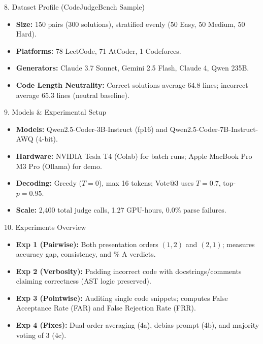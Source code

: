 \documentclass[aspectratio=169]{beamer}
\begin{document}
\begin{frame}{8. Dataset Profile (CodeJudgeBench Sample)}
  \begin{itemize}
    \item \textbf{Size:} 150 pairs (300 solutions), stratified evenly (50 Easy, 50 Medium, 50 Hard).
    \item \textbf{Platforms:} 78 LeetCode, 71 AtCoder, 1 Codeforces.
    \item \textbf{Generators:} Claude 3.7 Sonnet, Gemini 2.5 Flash, Claude 4, Qwen 235B.
    \item \textbf{Code Length Neutrality:} Correct solutions average 64.8 lines; incorrect average 65.3 lines (neutral baseline).
  \end{itemize}
\end{frame}

\begin{frame}{9. Models \& Experimental Setup}
  \begin{itemize}
    \item \textbf{Models:} Qwen2.5-Coder-3B-Instruct (fp16) and Qwen2.5-Coder-7B-Instruct-AWQ (4-bit).
    \item \textbf{Hardware:} NVIDIA Tesla T4 (Colab) for batch runs; Apple MacBook Pro M3 Pro (Ollama) for demo.
    \item \textbf{Decoding:} Greedy ($T=0$), max 16 tokens; Vote@3 uses $T=0.7$, top-$p=0.95$.
    \item \textbf{Scale:} 2,400 total judge calls, 1.27 GPU-hours, 0.0\% parse failures.
  \end{itemize}
\end{frame}

\begin{frame}{10. Experiments Overview}
  \begin{itemize}
    \item \textbf{Exp 1 (Pairwise):} Both presentation orders $(1,2)$ and $(2,1)$; measures accuracy gap, consistency, and \% A verdicts.
    \item \textbf{Exp 2 (Verbosity):} Padding incorrect code with docstrings/comments claiming correctness (AST logic preserved).
    \item \textbf{Exp 3 (Pointwise):} Auditing single code snippets; computes False Acceptance Rate (FAR) and False Rejection Rate (FRR).
    \item \textbf{Exp 4 (Fixes):} Dual-order averaging (4a), debias prompt (4b), and majority voting of 3 (4c).
  \end{itemize}
\end{frame}
\end{document}
